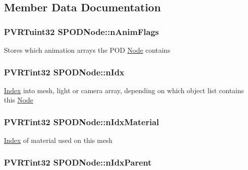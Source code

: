 \subsection{Member Data Documentation}
\hypertarget{struct_s_p_o_d_node_a4cc0807c7e832632a0c8725f2903bf6a}{
\subsubsection[{n\+Anim\+Flags}]{\setlength{\rightskip}{0pt plus 5cm}P\+V\+R\+Tuint32 S\+P\+O\+D\+Node\+::n\+Anim\+Flags}}\label{struct_s_p_o_d_node_a4cc0807c7e832632a0c8725f2903bf6a}
Stores which animation arrays the P\+O\+D \hyperlink{struct_node}{Node} contains \hypertarget{struct_s_p_o_d_node_a6fe7da92da2eb29226a03a012b6418b5}{
\subsubsection[{n\+Idx}]{\setlength{\rightskip}{0pt plus 5cm}P\+V\+R\+Tint32 S\+P\+O\+D\+Node\+::n\+Idx}}\label{struct_s_p_o_d_node_a6fe7da92da2eb29226a03a012b6418b5}
\hyperlink{struct_index}{Index} into mesh, light or camera array, depending on which object list contains this \hyperlink{struct_node}{Node} \hypertarget{struct_s_p_o_d_node_ac2a421119e765aeaec00697a51025fa3}{
\subsubsection[{n\+Idx\+Material}]{\setlength{\rightskip}{0pt plus 5cm}P\+V\+R\+Tint32 S\+P\+O\+D\+Node\+::n\+Idx\+Material}}\label{struct_s_p_o_d_node_ac2a421119e765aeaec00697a51025fa3}
\hyperlink{struct_index}{Index} of material used on this mesh \hypertarget{struct_s_p_o_d_node_a93599403158cd8d7c5395dec70427d9c}{
\subsubsection[{n\+Idx\+Parent}]{\setlength{\rightskip}{0pt plus 5cm}P\+V\+R\+Tint32 S\+P\+O\+D\+Node\+::n\+Idx\+Parent}}\label{struct_s_p_o_d_node_a93599403158cd8d7c5395dec70427d9c}

